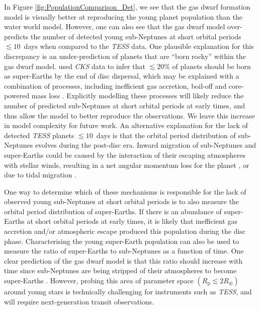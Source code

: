 \documentclass[fleqn,usenatbib]{mnras}
\begin{document}
In Figure \ref{fig:PopulationComparison_Det}, we see that the gas dwarf formation model is visually better at reproducing the young planet population than the water world model. However, one can also see that the gas dwarf model over-predicts the number of detected young sub-Neptunes at short orbital periods $\lesssim 10$~days when compared to the \textit{TESS} data. One plausible explanation for this discrepancy is an under-prediction of planets that are ``born rocky'' within the gas dwarf model. \citet{Rogers2021} used \textit{CKS} data to infer that $\lesssim 20\%$ of planets should be born as super-Earths by the end of disc dispersal, which may be explained with a combination of processes, including inefficient gas accretion, boil-off and core-powered mass loss \citep[e.g.][]{Lee2022,Owen2024,Rogers2024a}. Explicitly modelling these processes will likely reduce the number of predicted sub-Neptunes at short orbital periods at early times, and thus allow the model to better reproduce the observations. We leave this increase in model complexity for future work. An alternative explanation for the lack of detected \textit{TESS} planets $\lesssim 10$~days is that the orbital period distribution of sub-Neptunes evolves during the post-disc era. Inward migration of sub-Neptunes and super-Earths could be caused by the interaction of their escaping atmospheres with stellar winds, resulting in a net angular momentum loss for the planet \citep{Hanf2025}, or due to tidal migration \citep[e.g.][]{LeeOwen2025}.

One way to determine which of these mechanisms is responsible for the lack of observed young sub-Neptunes at short orbital periods is to also measure the orbital period distribution of super-Earths. If there is an abundance of super-Earths at short orbital periods at early times, it is likely that inefficient gas accretion and/or atmospheric escape produced this population during the disc phase. Characterising the young super-Earth population can also be used to measure the ratio of super-Earths to sub-Neptunes as a function of time. One clear prediction of the gas dwarf model is that this ratio should increase with time since sub-Neptunes are being stripped of their atmospheres to become super-Earths \citep[e.g.][]{Gupta2020,Rogers2021}. However, probing this area of parameter space $(R_\text{p} \lesssim 2 R_\oplus)$ around young stars is technically challenging for instruments such as \textit{TESS}, and will require next-generation transit observations.
\end{document}
